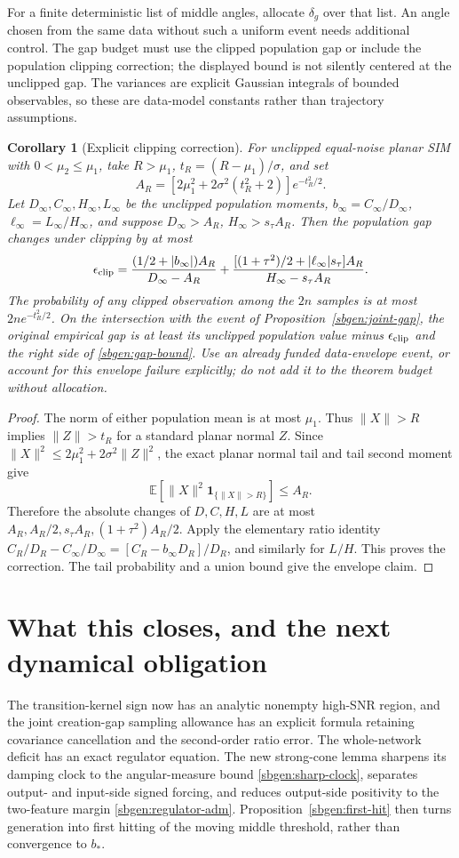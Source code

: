 \documentclass{article} %
\theoremstyle{plain}
\newtheorem{corollary}[theorem]{Corollary}
\theoremstyle{definition}
\theoremstyle{remark}
\begin{document}
For a finite deterministic list of middle angles, allocate $\delta_g$
over that list. An angle chosen from the same data without such a
uniform event needs additional control. The gap budget must use the
clipped population gap or include the population clipping correction;
the displayed bound is not silently centered at the unclipped gap.
The variances are explicit Gaussian integrals of bounded observables,
so these are data-model constants rather than trajectory assumptions.

\begin{corollary}[Explicit clipping correction]
\label{sbgen:gap-clipping}
For unclipped equal-noise planar SIM with $0<\mu_2\le\mu_1$, take
$R>\mu_1$, $t_R=(R-\mu_1)/\sigma$, and set
\[
 A_R=[2\mu_1^2+2\sigma^2(t_R^2+2)]e^{-t_R^2/2}.
\]
Let $D_\infty,C_\infty,H_\infty,L_\infty$ be the unclipped population
moments, $b_\infty=C_\infty/D_\infty$,
$\ell_\infty=L_\infty/H_\infty$, and suppose
$D_\infty>A_R$, $H_\infty>s_\tau A_R$.
Then the population gap changes under clipping by at most
\[
 \epsilon_{\rm clip}=
 \frac{(1/2+|b_\infty|)A_R}{D_\infty-A_R}
 +\frac{[(1+\tau^2)/2+|\ell_\infty|s_\tau]A_R}
          {H_\infty-s_\tau A_R}.
\]
The probability of any clipped observation among the $2n$ samples is
at most $2n e^{-t_R^2/2}$. On the intersection with the event of
Proposition~\ref{sbgen:joint-gap}, the original empirical gap is at
least its unclipped population value minus
$\epsilon_{\rm clip}$ and the right side of \eqref{sbgen:gap-bound}.
Use an already funded data-envelope event, or account for this envelope
failure explicitly; do not add it to the theorem budget without allocation.
\end{corollary}
\begin{proof}
The norm of either population mean is at most $\mu_1$. Thus
$\|X\|>R$ implies $\|Z\|>t_R$ for a standard planar normal $Z$.
Since $\|X\|^2\le2\mu_1^2+2\sigma^2\|Z\|^2$, the exact planar
normal tail and tail second moment give
\[
 \mathbb E[\|X\|^2\mathbf1_{\{\|X\|>R\}}]\le A_R.
\]
Therefore the absolute changes of $D,C,H,L$ are at most
$A_R,A_R/2,s_\tau A_R,(1+\tau^2)A_R/2$.
Apply the elementary ratio identity
$C_R/D_R-C_\infty/D_\infty
=[C_R-b_\infty D_R]/D_R$, and similarly for $L/H$.
This proves the correction. The tail probability and a union bound
give the envelope claim.
\end{proof}

\section{What this closes, and the next dynamical obligation}
The transition-kernel sign now has an analytic nonempty high-SNR region,
and the joint creation-gap sampling allowance has an explicit formula
retaining covariance cancellation and the second-order ratio error.
The whole-network deficit has an exact regulator equation.  The new
strong-cone lemma sharpens its damping clock to the angular-measure bound
\eqref{sbgen:sharp-clock}, separates output- and input-side signed forcing,
and reduces output-side positivity to the two-feature margin
\eqref{sbgen:regulator-adm}.  Proposition~\ref{sbgen:first-hit} then turns
generation into first hitting of the moving middle threshold, rather than
convergence to $b_*$.
\end{document}

